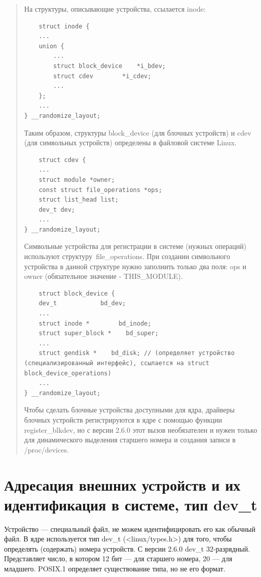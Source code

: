 \begin{quote}

На структуры, описывающие устройства, ссылается inode:

\begin{lstlisting}
	struct inode {
    ...
    union {
        ...
        struct block_device    *i_bdev;
        struct cdev        *i_cdev;
        ...
    };
    ...
} __randomize_layout;
\end{lstlisting}

Таким образом, структуры block\_device (для блочных устройств) и cdev (для символьных устройств) определены в файловой системе Linux.

\begin{lstlisting}
	struct cdev {
    ...
    struct module *owner;
    const struct file_operations *ops;
    struct list_head list;
    dev_t dev;
    ...
} __randomize_layout;
\end{lstlisting}

Символьные устройства для регистрации в системе (нужных операций) используют структуру file\_operations. При создании символьного устройства в данной структуре нужно заполнить только два поля: ops и owner (обязательное значение - THIS\_MODULE).

\begin{lstlisting}
	struct block_device {
    dev_t            bd_dev; 
    ...
    struct inode *        bd_inode; 
    struct super_block *    bd_super;
    ...
    struct gendisk *    bd_disk; // (определяет устройство (специализированный интерфейс), ссылается на struct block_device_operations)
    ...
} __randomize_layout;
\end{lstlisting}

Чтобы сделать блочные устройства доступными для ядра, драйверы блочных устройств регистрируются в ядре с помощью функции register\_blkdev, но с версии 2.6.0 этот вызов необязателен и нужен только для динамического выделения старшего номера и создания записи в /proc/devices.

\end{quote}

\section{Адресация внешних устройств и их идентификация в системе, тип dev\_t}

Устройство --- специальный файл, не можем идентифицировать его как обычный файл. В ядре используется тип dev\_t (<linux/types.h>) для того, чтобы определять (содержать) номера устройств. С версии 2.6.0 dev\_t 32-разрядный. Представляет число, в котором 12 бит --- для старшего номера, 20 --- для младшего. POSIX.1 определяет существование типа, но не его формат.

